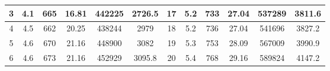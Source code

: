 \begin{table}[]
\begin{tabular}{|ccccccc|c|c|c|c|c|}
\multicolumn{1}{|c|}{3}           & \multicolumn{1}{c|}{4.1}                                                                    & \multicolumn{1}{c|}{665}                                                                     & \multicolumn{1}{c|}{16.81}          & \multicolumn{1}{c|}{442225}         & \multicolumn{1}{c|}{2726.5}      & 17          & 5.2                                                                     & 733                                                                       & 27.04                          & 537289                           & 3811.6                          \\ \hline
\multicolumn{1}{|c|}{4}           & \multicolumn{1}{c|}{4.5}                                                                    & \multicolumn{1}{c|}{662}                                                                     & \multicolumn{1}{c|}{20.25}          & \multicolumn{1}{c|}{438244}         & \multicolumn{1}{c|}{2979}        & 18          & 5.2                                                                     & 736                                                                       & 27.04                          & 541696                           & 3827.2                          \\ \hline
\multicolumn{1}{|c|}{5}           & \multicolumn{1}{c|}{4.6}                                                                    & \multicolumn{1}{c|}{670}                                                                     & \multicolumn{1}{c|}{21.16}          & \multicolumn{1}{c|}{448900}         & \multicolumn{1}{c|}{3082}        & 19          & 5.3                                                                     & 753                                                                       & 28.09                          & 567009                           & 3990.9                          \\ \hline
\multicolumn{1}{|c|}{6}           & \multicolumn{1}{c|}{4.6}                                                                    & \multicolumn{1}{c|}{673}                                                                     & \multicolumn{1}{c|}{21.16}          & \multicolumn{1}{c|}{452929}         & \multicolumn{1}{c|}{3095.8}      & 20          & 5.4                                                                     & 768                                                                       & 29.16                          & 589824                           & 4147.2                          \\ \hline

\end{tabular}
\end{table}
